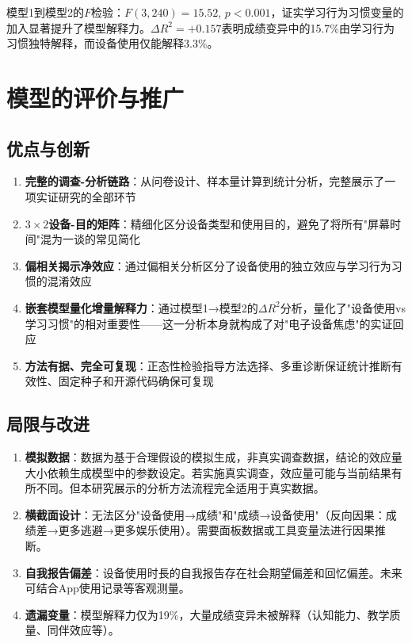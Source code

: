 \documentclass[11pt]{ctexart}
\begin{document}
模型1到模型2的$F$检验：$F(3,240) = 15.52$, $p<0.001$，证实学习行为习惯变量的加入显著提升了模型解释力。$\Delta R^2=+0.157$表明成绩变异中的15.7\%由学习行为习惯独特解释，而设备使用仅能解释3.3\%。

\section{模型的评价与推广}

\subsection{优点与创新}

\begin{enumerate}[leftmargin=*]
    \item \textbf{完整的调查-分析链路}：从问卷设计、样本量计算到统计分析，完整展示了一项实证研究的全部环节
    \item \textbf{$3\times2$设备-目的矩阵}：精细化区分设备类型和使用目的，避免了将所有"屏幕时间"混为一谈的常见简化
    \item \textbf{偏相关揭示净效应}：通过偏相关分析区分了设备使用的独立效应与学习行为习惯的混淆效应
    \item \textbf{嵌套模型量化增量解释力}：通过模型1→模型2的$\Delta R^2$分析，量化了"设备使用vs学习习惯"的相对重要性——这一分析本身就构成了对"电子设备焦虑"的实证回应
    \item \textbf{方法有据、完全可复现}：正态性检验指导方法选择、多重诊断保证统计推断有效性、固定种子和开源代码确保可复现
\end{enumerate}

\subsection{局限与改进}

\begin{enumerate}[leftmargin=*]
    \item \textbf{模拟数据}：数据为基于合理假设的模拟生成，非真实调查数据，结论的效应量大小依赖生成模型中的参数设定。若实施真实调查，效应量可能与当前结果有所不同。但本研究展示的分析方法流程完全适用于真实数据。
    \item \textbf{横截面设计}：无法区分"设备使用→成绩"和"成绩→设备使用"（反向因果：成绩差→更多逃避→更多娱乐使用）。需要面板数据或工具变量法进行因果推断。
    \item \textbf{自我报告偏差}：设备使用时長的自我报告存在社会期望偏差和回忆偏差。未来可结合App使用记录等客观测量。
    \item \textbf{遗漏变量}：模型解释力仅为19\%，大量成绩变异未被解释（认知能力、教学质量、同伴效应等）。
\end{enumerate}
\end{document}
